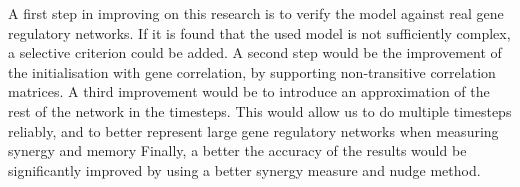 \documentclass[../main.tex]{subfiles}
\begin{document}

A first step in improving on this research is to verify the model against real gene regulatory networks.
If it is found that the used model is not sufficiently complex, a selective criterion could be added.
A second step would be the improvement of the initialisation with gene correlation, by supporting non-transitive correlation matrices.
A third improvement would be to introduce an approximation of the rest of the network in the timesteps.
This would allow us to do multiple timesteps reliably, and to better represent large gene regulatory networks when measuring synergy and memory %
Finally, a better the accuracy of the results would be significantly improved by using a better synergy measure and nudge method.

\end{document}
